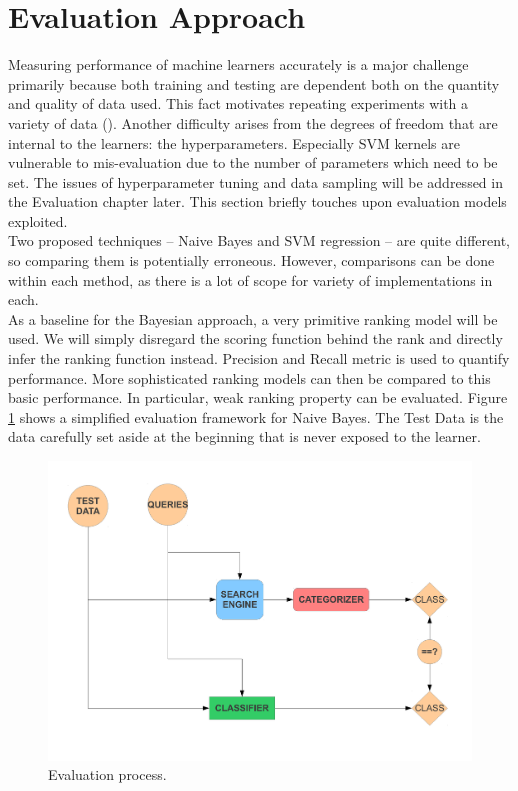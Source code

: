 \documentclass[12pt,notitlepage,twoside]{scrreprt}
\begin{document}
\section{Evaluation Approach}
Measuring performance of machine learners accurately is a major challenge
primarily because both training and testing are dependent both on the quantity
and quality of data used. This fact motivates repeating experiments with a
variety of data (). Another difficulty arises from the
degrees of freedom that are internal to the learners: the hyperparameters.
Especially SVM kernels are vulnerable to mis-evaluation due to the number of
parameters which need to be set. The issues of hyperparameter tuning and data
sampling will be addressed in the Evaluation chapter later. This section
briefly touches upon evaluation models exploited.\\
Two proposed techniques -- Naive Bayes and SVM regression -- are quite different, so
comparing them is potentially erroneous. However, comparisons can be done
within each method, as there is a lot of scope for variety of implementations
in each.\\
As a baseline for the Bayesian approach, a very primitive ranking model will be
used. We will simply disregard the scoring function behind the rank and
directly infer the ranking function instead. Precision and Recall metric is
used to quantify performance. More sophisticated ranking models
can then be compared to this basic performance. In particular, weak ranking
property can be evaluated.
Figure \ref{eval} shows a simplified evaluation framework for Naive Bayes.  The Test Data
is the data carefully set aside at the beginning that is never exposed to the
learner. 
\begin{figure}[h]
\centering
\includegraphics[scale=0.5]{figs/eval.pdf}
\caption{Evaluation process. }
\label{eval}
\end{figure}
\end{document}

